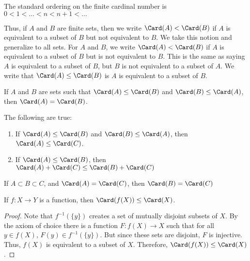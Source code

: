 \documentclass[crop=false,class=book,oneside]{standalone}
\begin{document}
            \begin{definition}
                The standard ordering on the finite cardinal
                number is $0<1<\hdots<n<n+1<\hdots$
            \end{definition}
            Thus, if $A$ and $B$ are finite sets, then we write
            $\Card(A)<\Card(B)$ if $A$ is equivalent to a
            subset of $B$ but not equivalent to $B$.
            We take this notion and generalize to
            all sets. For $A$ and $B$, we write
            $\Card(A)<\Card(B)$ if $A$ is equivalent to a subset
            of $B$ but is not equivalent to $B$. This is the
            same as saying $A$ is equivalent to a subset of $B$,
            but $B$ is not equivalent to a subset of $A$.
            We write that
            $\Card(A)\leq\Card(B)$ is $A$ is equivalent to a
            subset of $B$.
            \begin{theorem*}
                If $A$ and $B$ are sets such that
                $\Card(A)\leq\Card(B)$ and
                $\Card(B)\leq\Card(A)$, then
                $\Card(A)=\Card(B)$.
            \end{theorem*}
            \begin{theorem*}
                The following are true:
                \begin{enumerate}
                    \item If $\Card(A)\leq\Card(B)$ and
                          $\Card(B)\leq\Card(A)$, then
                          $\Card(A)\leq\Card(C)$.
                    \item If $\Card(A)\leq\Card(B)$, then
                          $\Card(A)+\Card(C)\leq\Card(B)+\Card(C)$
                \end{enumerate}
            \end{theorem*}
            \begin{theorem*}
                If ${A}\subset{B}\subset{C}$, and
                $\Card(A)=\Card(C)$, then $\Card(B)=\Card(C)$
            \end{theorem*}
            \begin{theorem*}
                If $f:{X}\rightarrow{Y}$ is a function,
                then $\Card(f(X))\leq\Card(X)$.
            \end{theorem*}
            \begin{proof}
                Note that $f^{-1}(\{y\})$ creates a set of
                mutually disjoint subsets of $X$. By the
                axiom of choice there is a function
                $F:{f(X)}\rightarrow{X}$
                such that for all ${y}\in{f(X)}$,
                ${F(y)}\in{f^{-1}(\{y\})}$. But since these
                sets are disjoint, $F$ is injective.
                Thus, $f(X)$ is equivalent to a subset of $X$.
                Therefore, $\Card(f(X))\leq\Card(X)$.
            \end{proof}
\end{document}
